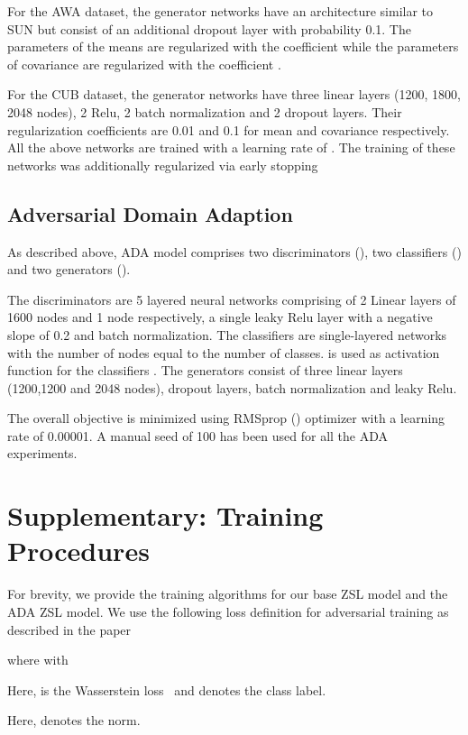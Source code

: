 \documentclass[10pt,twocolumn,letterpaper]{article}
\begin{document}
For the AWA dataset, the generator networks have an architecture similar to SUN but consist of an additional dropout layer with probability 0.1. The parameters of the means are regularized with the coefficient  while the parameters of covariance are regularized with the coefficient .

For the CUB dataset, the generator networks have three linear layers (1200, 1800, 2048 nodes), 2 Relu, 2 batch normalization and 2 dropout layers. Their regularization coefficients are 0.01 and 0.1 for mean and covariance respectively. All the above networks are trained with a learning rate of . The training of these networks was additionally regularized via early stopping
\subsection{Adversarial Domain Adaption} As described above, ADA model comprises two discriminators (), two classifiers () and two generators (). 

The discriminators  are 5 layered neural networks comprising of 2 Linear layers of 1600 nodes and 1 node respectively, a single leaky Relu layer with a negative slope of 0.2 and batch normalization. The classifiers are single-layered networks with the number of nodes equal to the number of classes.  is used as activation function for the classifiers . The generators  consist of three linear layers (1200,1200 and 2048 nodes), dropout layers, batch normalization and leaky Relu.

The overall objective is minimized using RMSprop (\cite{hinton2012neural}) optimizer with a learning rate of 0.00001. A manual seed of 100 has been used for all the ADA experiments.


\section{Supplementary: Training Procedures}
For brevity, we provide the training algorithms for our base ZSL model and the ADA ZSL model. We use the following loss definition for adversarial training as described in the paper

where  with




Here,  is the Wasserstein loss~\cite{arjovsky2017wasserstein} and  denotes the class label.

Here,  denotes the  norm.
\end{document}

